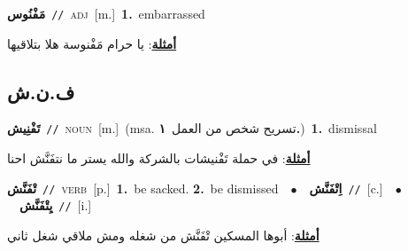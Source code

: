 \documentclass[10pt,a4paper,twoside]{article} %
\begin{document}
\begin{multicols}{2}
{\setlength\topsep{0pt}\textbf{\foreignlanguage{arabic}{مَفْنُوس}}\ {\color{gray}\texttt{//}\color{black}}\ \textsc{adj}\ [m.]\ \textbf{1.}~embarrassed\  \begin{flushright}\color{gray}\foreignlanguage{arabic}{\textbf{\underline{\foreignlanguage{arabic}{أمثلة}}}: يا حرام مَفْنوسة هلا بتلاقيها}\end{flushright}\color{black}} \vspace{2mm}

\vspace{-3mm}
\subsection*{\color{blue}\foreignlanguage{arabic}{ف.ن.ش}\color{blue}{}} 

{\setlength\topsep{0pt}\textbf{\foreignlanguage{arabic}{تَفْنِيش}}\ {\color{gray}\texttt{//}\color{black}}\ \textsc{noun}\ [m.]\ \color{gray}(msa. \foreignlanguage{arabic}{تسريح شخص من العمل}~\foreignlanguage{arabic}{\textbf{١.}})\color{black}\ \textbf{1.}~dismissal\  \begin{flushright}\color{gray}\foreignlanguage{arabic}{\textbf{\underline{\foreignlanguage{arabic}{أمثلة}}}: في حملة تَفْنيشات بالشركة والله يستر ما نتفَنَّش احنا}\end{flushright}\color{black}} \vspace{2mm}

{\setlength\topsep{0pt}\textbf{\foreignlanguage{arabic}{تْفَنَّش}}\ {\color{gray}\texttt{//}\color{black}}\ \textsc{verb}\ [p.]\ \textbf{1.}~be sacked.  \textbf{2.}~be dismissed\ \ $\bullet$\ \ \setlength\topsep{0pt}\textbf{\foreignlanguage{arabic}{اِتْفَنَّش}}\ {\color{gray}\texttt{//}\color{black}}\ [c.]\ \ $\bullet$\ \ \setlength\topsep{0pt}\textbf{\foreignlanguage{arabic}{يِتْفَنَّش}}\ {\color{gray}\texttt{//}\color{black}}\ [i.]\  \begin{flushright}\color{gray}\foreignlanguage{arabic}{\textbf{\underline{\foreignlanguage{arabic}{أمثلة}}}: أبوها المسكين تْفَنَّش من شغله ومش ملاقي شغل ثاني}\end{flushright}\color{black}} \vspace{2mm}


\end{multicols}
\end{document}
